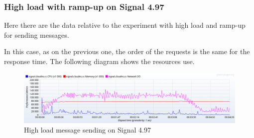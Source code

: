 \subsubsection{High load with ramp-up on Signal 4.97}

Here there are the data relative to the experiment with high load and ramp-up for sending messages.

\begin{table}[H]
\caption{High load message sending on Signal 4.97}
\label{tab:highloadmessageold}
\end{table}

In this case, as on the previous one, the order of the requests is the same for the response time.
The following diagram shows the resources use.

\begin{figure}[H]
    \centering
    \includegraphics[width=\textwidth]{images/497/signal-message-load}
    \caption{High load message sending on Signal 4.97}
    \label{fig:signalmessageloadold}
\end{figure}


